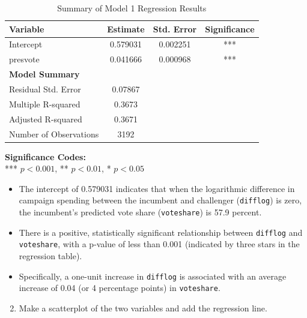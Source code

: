 \documentclass[12pt,letterpaper]{article}
\begin{document}
\begin{table}[h!]
	\centering
	\caption{Summary of Model 1 Regression Results}
	\vspace{0.25cm}
	\begin{tabular}{lccc}
		\toprule
		\textbf{Variable} & \textbf{Estimate} & \textbf{Std. Error} & \textbf{Significance} \\ 
		\midrule
		Intercept              & 0.579031 & 0.002251 & *** \\ 
		presvote               & 0.041666 & 0.000968 & *** \\ 
		\midrule
		\textbf{Model Summary} & & & \\
		Residual Std. Error    & 0.07867  & & \\ 
		Multiple R-squared     & 0.3673   & & \\ 
		Adjusted R-squared     & 0.3671   & & \\ 
		Number of Observations & 3192     & & \\ 
		\bottomrule
	\end{tabular}
\end{table}

\vspace{0.1cm}
\noindent\textbf{Significance Codes:} \\
*** $p < 0.001$, ** $p < 0.01$, * $p < 0.05$
	
\vspace{0.5cm} \begin{itemize}[left=0pt, label=\textbullet]
\item The intercept of 0.579031 indicates that when the logarithmic difference in campaign spending between the incumbent and challenger (\texttt{difflog}) is zero, the incumbent's predicted vote share (\texttt{voteshare}) is 57.9 percent.
\item There is a positive, statistically significant relationship between \texttt{difflog} and \texttt{voteshare}, with a p-value of less than 0.001 (indicated by three stars in the regression table).
\item Specifically, a one-unit increase in \texttt{difflog} is associated with an average increase of 0.04 (or 4 percentage points) in \texttt{voteshare}. 
\end{itemize}

\newpage
	\begin{enumerate}[left=0pt]
	\setcounter{enumi}{1}
		\item Make a scatterplot of the two variables and add the regression line.
	\end{enumerate}
\end{document}
